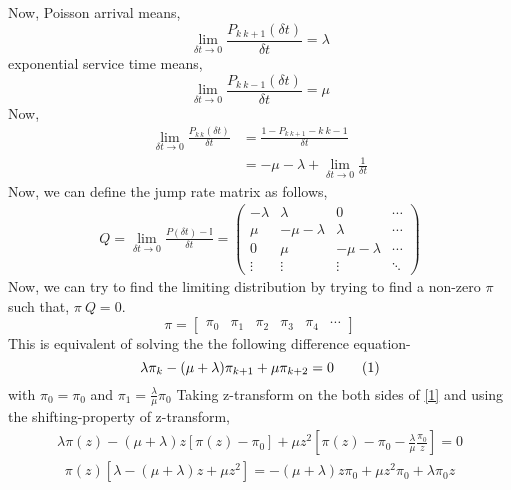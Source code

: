 \documentclass{article}
\theoremstyle{remark}
\newcommand\numberthis{\addtocounter{equation}{1}\tag{\theequation}}
\begin{document}
Now, Poisson arrival means,
\[
    \lim_{{\delta t} \to 0} \frac{P_{k\:k+1}(\delta t)}{\delta t} = \lambda
\]
exponential service time means,
\[
    \lim_{{\delta t} \to 0} \frac{P_{k\:k-1}(\delta t)}{\delta t} = \mu
\]
Now,
\begin{align*}
    \lim_{{\delta t} \to 0} \frac{P_{k\:k}(\delta t)}{\delta t} &=  \frac{1-P_{k\:k+1}-k\:k-1}{\delta t}\\
    &= -\mu-\lambda+\lim_{{\delta t} \to 0} \frac{1}{\delta t}
\end{align*}
Now, we can define the jump rate matrix as follows,
\begin{align*}
    Q = \lim_{{\delta t} \to 0} \frac{P(\delta t)-\mathbb{I}}{\delta t} = 
\begin{pmatrix}
-\lambda & \lambda & 0 & \cdots \\ 
 \mu& -\mu-\lambda & \lambda & \cdots \\ 
 0 & \mu & -\mu-\lambda & \cdots \\ 
 \vdots & \vdots & \vdots & \ddots 
\end{pmatrix}
\end{align*}
Now, we can try to find the limiting distribution by trying to find a non-zero $\pi$ such that, $\pi\:Q=0$.
\[
    \pi = 
    \begin{bmatrix}
 \pi_0& \pi_1& \pi_2 & \pi_3 & \pi_4 & \cdots 
\end{bmatrix}
\]
This is equivalent of solving the the following difference equation-
\[
    \lambda \pi_k - (\mu+\lambda) \pi_{k+1} + \mu \pi_{k+2} = 0 \numberthis{\label{1}}
\]
with $\pi_0=\pi_0$ and $\pi_1=\frac{\lambda}{\mu}\pi_0$
Taking z-transform on the both sides of \eqref{1} and using the shifting-property of z-transform,
\begin{align*}
    \lambda \pi(z) - (\mu+\lambda) z \left [\pi(z)-\pi_0 \right ]+ \mu z^2 \left [ \pi(z)-\pi_0-\frac{\lambda}{\mu}\frac{\pi_0}{z} \right ] = 0
\end{align*}
\begin{align*}
    \pi(z) \left [ \lambda - (\mu+\lambda) z + \mu z^2  \right ] = - (\mu+\lambda) z \pi_0 + \mu z^2 \pi_0 + \lambda \pi_0 z
\end{align*}
\end{document}
